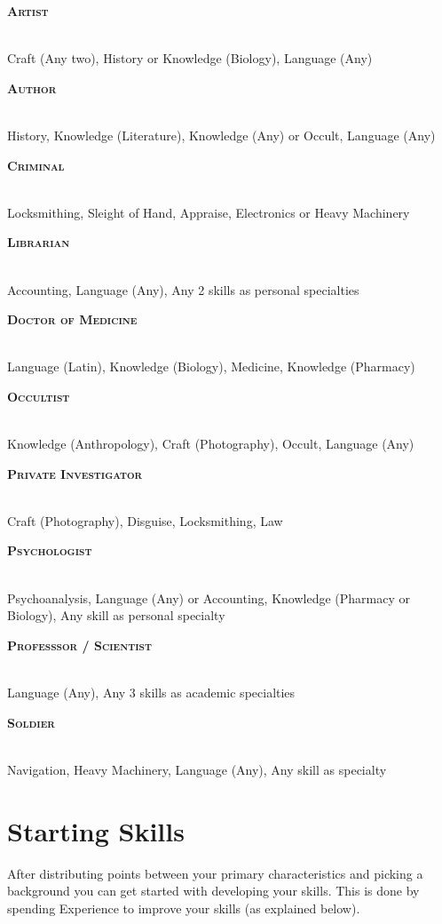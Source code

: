 \newcommand{\makebackground}[3]{
    \noindent
    \begin{minipage}{\linewidth}
        {\raggedright\normalfont\large\bfseries\scshape #1}\\
        #3
    \end{minipage}
    \par
}
\vspace{\parskip}
\begin{multicols}{2}
    \makebackground{Artist}{}
    {Craft (Any two), History or Knowledge (Biology), Language (Any)}

    \makebackground{Author}{}
    {History, Knowledge (Literature), Knowledge (Any) or Occult, Language (Any)}

    \makebackground{Criminal}{}
    {Locksmithing, Sleight of Hand, Appraise, Electronics or Heavy Machinery}
    
    \makebackground{Librarian}{}
    {Accounting, Language (Any), Any 2 skills as personal specialties}
    
    \makebackground{Doctor of Medicine}{}
    {Language (Latin), Knowledge (Biology), Medicine, Knowledge (Pharmacy)}

    \makebackground{Occultist}{}
    {Knowledge (Anthropology), Craft (Photography), Occult, Language (Any)}
   
    \makebackground{Private Investigator}{}
    {Craft (Photography), Disguise, Locksmithing, Law}

    \makebackground{Psychologist}{}
    {Psychoanalysis, Language (Any) or Accounting, Knowledge (Pharmacy or Biology), Any skill as personal specialty}

    \makebackground{Professsor / Scientist}{}
    {Language (Any), Any 3 skills as academic specialties}

    \makebackground{Soldier}{}
    {Navigation, Heavy Machinery, Language (Any), Any skill as specialty}

\end{multicols}

\section{Starting Skills}
After distributing points between your primary characteristics and picking a background
you can get started with developing your skills. This is done by spending Experience to improve your skills (as explained below). 

